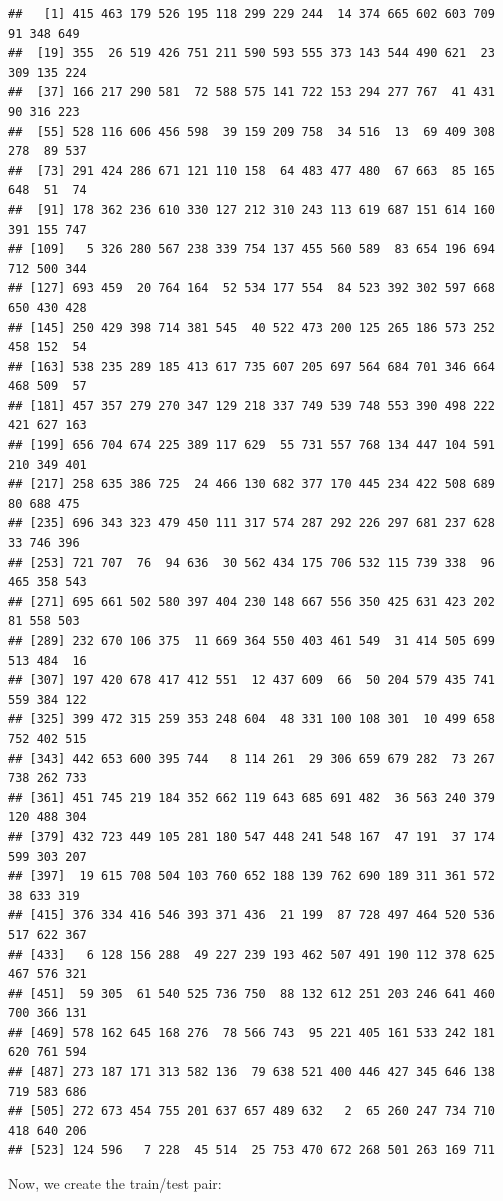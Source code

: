\documentclass[
]{article}
\begin{document}
\begin{verbatim}
##   [1] 415 463 179 526 195 118 299 229 244  14 374 665 602 603 709  91 348 649
##  [19] 355  26 519 426 751 211 590 593 555 373 143 544 490 621  23 309 135 224
##  [37] 166 217 290 581  72 588 575 141 722 153 294 277 767  41 431  90 316 223
##  [55] 528 116 606 456 598  39 159 209 758  34 516  13  69 409 308 278  89 537
##  [73] 291 424 286 671 121 110 158  64 483 477 480  67 663  85 165 648  51  74
##  [91] 178 362 236 610 330 127 212 310 243 113 619 687 151 614 160 391 155 747
## [109]   5 326 280 567 238 339 754 137 455 560 589  83 654 196 694 712 500 344
## [127] 693 459  20 764 164  52 534 177 554  84 523 392 302 597 668 650 430 428
## [145] 250 429 398 714 381 545  40 522 473 200 125 265 186 573 252 458 152  54
## [163] 538 235 289 185 413 617 735 607 205 697 564 684 701 346 664 468 509  57
## [181] 457 357 279 270 347 129 218 337 749 539 748 553 390 498 222 421 627 163
## [199] 656 704 674 225 389 117 629  55 731 557 768 134 447 104 591 210 349 401
## [217] 258 635 386 725  24 466 130 682 377 170 445 234 422 508 689  80 688 475
## [235] 696 343 323 479 450 111 317 574 287 292 226 297 681 237 628  33 746 396
## [253] 721 707  76  94 636  30 562 434 175 706 532 115 739 338  96 465 358 543
## [271] 695 661 502 580 397 404 230 148 667 556 350 425 631 423 202  81 558 503
## [289] 232 670 106 375  11 669 364 550 403 461 549  31 414 505 699 513 484  16
## [307] 197 420 678 417 412 551  12 437 609  66  50 204 579 435 741 559 384 122
## [325] 399 472 315 259 353 248 604  48 331 100 108 301  10 499 658 752 402 515
## [343] 442 653 600 395 744   8 114 261  29 306 659 679 282  73 267 738 262 733
## [361] 451 745 219 184 352 662 119 643 685 691 482  36 563 240 379 120 488 304
## [379] 432 723 449 105 281 180 547 448 241 548 167  47 191  37 174 599 303 207
## [397]  19 615 708 504 103 760 652 188 139 762 690 189 311 361 572  38 633 319
## [415] 376 334 416 546 393 371 436  21 199  87 728 497 464 520 536 517 622 367
## [433]   6 128 156 288  49 227 239 193 462 507 491 190 112 378 625 467 576 321
## [451]  59 305  61 540 525 736 750  88 132 612 251 203 246 641 460 700 366 131
## [469] 578 162 645 168 276  78 566 743  95 221 405 161 533 242 181 620 761 594
## [487] 273 187 171 313 582 136  79 638 521 400 446 427 345 646 138 719 583 686
## [505] 272 673 454 755 201 637 657 489 632   2  65 260 247 734 710 418 640 206
## [523] 124 596   7 228  45 514  25 753 470 672 268 501 263 169 711
\end{verbatim}

Now, we create the train/test pair:
\end{document}
